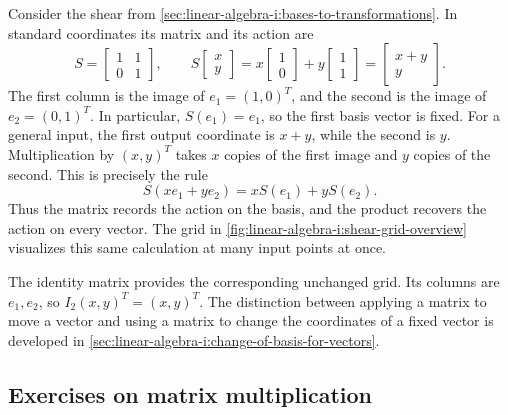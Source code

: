 Consider the shear from
\autoref{sec:linear-algebra-i:bases-to-transformations}. In standard
coordinates its matrix and its action are
\[
  S=\begin{bmatrix}1&1\\0&1\end{bmatrix},
  \qquad
  S\begin{bmatrix}x\\y\end{bmatrix}
    =x\begin{bmatrix}1\\0\end{bmatrix}
      +y\begin{bmatrix}1\\1\end{bmatrix}
    =\begin{bmatrix}x+y\\y\end{bmatrix}.
\]
The first column is the image of \(e_1=(1,0)^T\), and the second is
the image of \(e_2=(0,1)^T\). In particular, \(S(e_1)=e_1\), so
the first basis vector is fixed. For a general input, the first output
coordinate is \(x+y\), while the second is \(y\).
Multiplication by \((x,y)^T\) takes
\(x\) copies of the first image and \(y\) copies of the second.
This is precisely the rule
\[
  S(xe_1+ye_2)=xS(e_1)+yS(e_2).
\]
Thus the matrix records the action on the basis, and the product recovers
the action on every vector. The grid in
\autoref{fig:linear-algebra-i:shear-grid-overview} visualizes this same
calculation at many input points at once.

The identity matrix provides the corresponding unchanged grid. Its columns
are \(e_1,e_2\), so \(I_2(x,y)^T=(x,y)^T\). The distinction between
applying a matrix to move a vector and using a matrix to change the
coordinates of a fixed vector is developed in
\autoref{sec:linear-algebra-i:change-of-basis-for-vectors}.

\subsection{Exercises on matrix multiplication}









